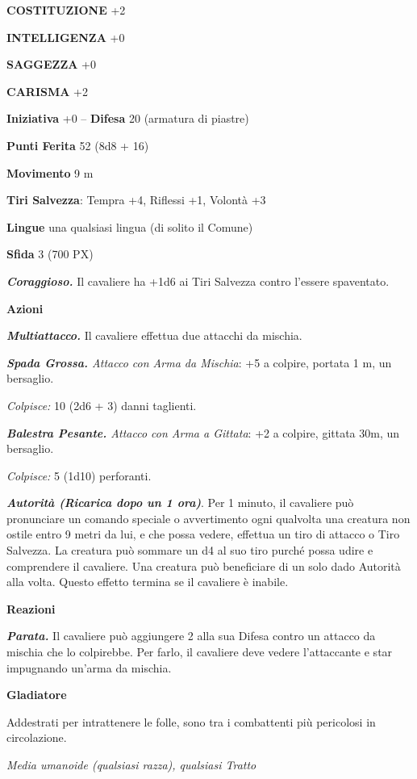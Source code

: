 \begin{multicols}{2}
	\textbf{COSTITUZIONE} +2

	\textbf{INTELLIGENZA} +0

	\textbf{SAGGEZZA} +0

	\textbf{CARISMA} +2

	\textbf{Iniziativa} +0 -- \textbf{Difesa} 20 (armatura di piastre)

	\textbf{Punti Ferita} 52 (8d8 + 16)

	\textbf{Movimento} 9 m

	\textbf{Tiri Salvezza}: Tempra +4, Riflessi +1, Volontà +3

	\textbf{Lingue} una qualsiasi lingua (di solito il Comune)

	\textbf{Sfida} 3 (700 PX)

	\textit{\textbf{Coraggioso.}} Il cavaliere ha +1d6 ai Tiri Salvezza contro l'essere spaventato.

	\textbf{Azioni}

	\textit{\textbf{Multiattacco.}} Il cavaliere effettua due attacchi da mischia.

	\textit{\textbf{Spada Grossa.} Attacco con Arma da Mischia}: +5 a colpire, portata 1 m, un bersaglio.

	\textit{Colpisce:} 10 (2d6 + 3) danni taglienti.

	\textit{\textbf{Balestra Pesante.} Attacco con Arma a Gittata}: +2 a colpire, gittata 30m, un bersaglio.

	\textit{Colpisce:} 5 (1d10) perforanti.

	\textit{\textbf{Autorità (Ricarica dopo un 1 ora)}}. Per 1 minuto, il cavaliere può pronunciare un comando speciale o avvertimento ogni qualvolta una creatura non ostile entro 9 metri da lui, e che possa vedere, effettua un tiro di attacco o Tiro Salvezza. La creatura può sommare un d4 al suo tiro purché possa udire e comprendere il cavaliere. Una creatura può beneficiare di un solo dado Autorità alla volta. Questo effetto termina se il cavaliere è inabile.

	\textbf{Reazioni}

	\textit{\textbf{Parata.}} Il cavaliere può aggiungere 2 alla sua Difesa contro un attacco da mischia che lo colpirebbe. Per farlo, il cavaliere deve vedere l'attaccante e star impugnando un'arma da mischia.

	\medskip\textbf{Gladiatore}

	Addestrati per intrattenere le folle, sono tra i combattenti più pericolosi in circolazione.

	\textit{Media umanoide (qualsiasi razza), qualsiasi Tratto}


\end{multicols}
